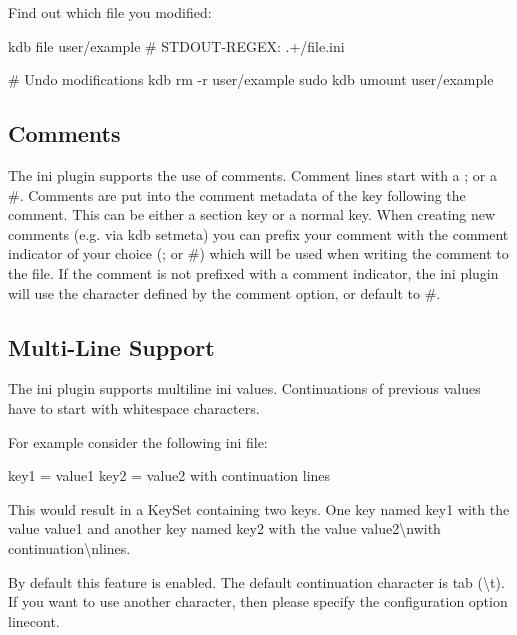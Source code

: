 Find out which file you modified\+:


\begin{DoxyCode}
kdb file user/example
# STDOUT-REGEX: .+/file.ini

# Undo modifications
kdb rm -r user/example
sudo kdb umount user/example
\end{DoxyCode}


\subsection*{Comments}

The ini plugin supports the use of comments. Comment lines start with a \textquotesingle{};\textquotesingle{} or a \textquotesingle{}\#\textquotesingle{}. Comments are put into the comment metadata of the key following the comment. This can be either a section key or a normal key. When creating new comments (e.\+g. via {\ttfamily kdb setmeta}) you can prefix your comment with the comment indicator of your choice (\textquotesingle{};\textquotesingle{} or \textquotesingle{}\#\textquotesingle{}) which will be used when writing the comment to the file. If the comment is not prefixed with a comment indicator, the ini plugin will use the character defined by the {\ttfamily comment} option, or default to \textquotesingle{}\#\textquotesingle{}.

\subsection*{Multi-\/\+Line Support}

The ini plugin supports multiline ini values. Continuations of previous values have to start with whitespace characters.

For example consider the following ini file\+:


\begin{DoxyCode}
key1 = value1
key2 = value2
        with continuation
        lines
\end{DoxyCode}


This would result in a Key\+Set containing two keys. One key named {\ttfamily key1} with the value {\ttfamily value1} and another key named {\ttfamily key2} with the value {\ttfamily value2\textbackslash{}nwith continuation\textbackslash{}nlines}.

By default this feature is enabled. The default continuation character is tab ({\ttfamily \textbackslash{}t}). If you want to use another character, then please specify the configuration option {\ttfamily linecont}.

